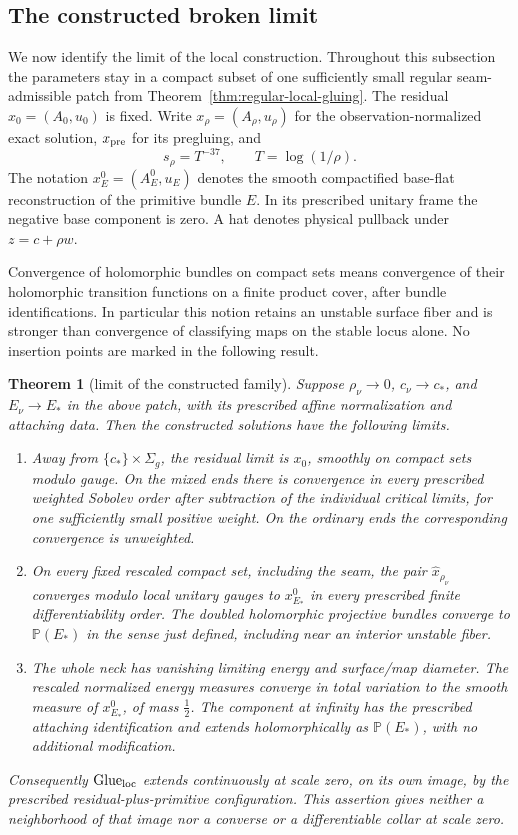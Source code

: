 \documentclass[11pt]{amsart}
\newtheorem{theorem}{Theorem}[section]
\theoremstyle{definition}
\theoremstyle{remark}
\theoremstyle{plain}
\newcommand{\PP}{\mathbb{P}}
\newcommand{\Glue}{\operatorname{Glue}}
\begin{document}
\subsection{The constructed broken limit}\label{sec:constructed-limit}

We now identify the limit of the local construction. Throughout this
subsection the parameters stay in a compact subset of one sufficiently
small regular seam-admissible patch from
Theorem~\ref{thm:regular-local-gluing}. The residual $x_0=(A_0,u_0)$ is
fixed. Write $x_\rho=(A_\rho,u_\rho)$ for the observation-normalized
exact solution, $x_{\rm pre}$ for its pregluing, and
\[
                  s_\rho=T^{-37},\qquad T=\log(1/\rho).
\]
The notation $x_E^0=(A_E^0,u_E)$ denotes the smooth compactified
base-flat reconstruction of the primitive bundle $E$. In its prescribed
unitary frame the negative base component is zero. A hat denotes physical
pullback under $z=c+\rho w$.

Convergence of holomorphic bundles on compact sets means convergence of
their holomorphic transition functions on a finite product cover, after
bundle identifications. In particular this notion retains an unstable
surface fiber and is stronger than convergence of classifying maps on the
stable locus alone. No insertion points are marked in the following result.

\begin{theorem}[limit of the constructed family]
\label{thm:constructed-broken-limit}
Suppose $\rho_\nu\to0$, $c_\nu\to c_*$, and $E_\nu\to E_*$ in the
above patch, with its prescribed affine normalization and attaching data.
Then the constructed solutions have the following limits.
\begin{enumerate}
\item Away from $\{c_*\}\times\Sigma_g$, the residual limit is $x_0$,
smoothly on compact sets modulo gauge. On the mixed ends there is
convergence in every prescribed weighted Sobolev order after subtraction
of the individual critical limits, for one sufficiently small positive
weight. On the ordinary ends the corresponding convergence is unweighted.
\item On every fixed rescaled compact set, including the seam, the pair
$\widehat x_{\rho_\nu}$ converges modulo local unitary gauges to
$x_{E_*}^0$ in every prescribed finite differentiability order. The doubled
holomorphic projective bundles converge to $\PP(E_*)$ in the sense just
defined, including near an interior unstable fiber.
\item The whole neck has vanishing limiting energy and surface/map
diameter. The rescaled normalized energy measures converge in total
variation to the smooth measure of $x_{E_*}^0$, of mass $\frac12$.
The component at infinity has the prescribed attaching identification and
extends holomorphically as $\PP(E_*)$, with no additional modification.
\end{enumerate}
Consequently $\Glue_{\rm loc}$ extends continuously at scale zero, on
its own image, by the prescribed residual-plus-primitive configuration.
This assertion gives neither a neighborhood of that image nor a converse
or a differentiable collar at scale zero.
\end{theorem}
\end{document}
